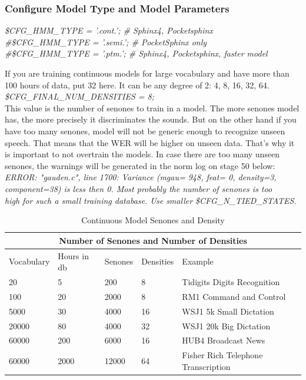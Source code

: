 \documentclass[12pt,a4paper,oneside]{memoir}
\begin{document}
\subsubsection{Configure Model Type and Model Parameters}
\textit{
\$CFG\_HMM\_TYPE = '.cont.'; \# Sphinx4, Pocketsphinx\\
\#\$CFG\_HMM\_TYPE  = '.semi.'; \# PocketSphinx only\\
\#\$CFG\_HMM\_TYPE  = '.ptm.'; \# Sphinx4, Pocketsphinx, faster model\\
}


If you are training continuous models for large vocabulary and have more than 100 hours of data, put 32 here. It can be any degree of 2: 4, 8, 16, 32, 64. 
\textit{\$CFG\_FINAL\_NUM\_DENSITIES = 8;}\\

This value is the number of senones to train in a model. The more senones model has, the more precisely it discriminates the sounds. But on the other hand if you have too many senones, model will not be generic enough to recognize unseen speech. That means that the WER will be higher on unseen data. That's why it is important to not overtrain the models. In case there are too many unseen senones, the warnings will be generated in the norm log on stage 50 below: 
\textit{
ERROR: "gauden.c", line 1700: Variance (mgau= 948, feat= 0, density=3, \\
component=38) is less then 0. Most probably the number of senones is too\\
high for such a small training database. Use smaller \$CFG\_N\_TIED\_STATES.}

\begin{table}
\centering
\caption{Continuous Model Senones and Density}
\begin{tabular}
{ |p{2cm}||p{2cm}|p{2cm}|p{2cm}|p{3cm}|  }
 \hline

 \multicolumn{5}{|c|}{Number of Senones and Number of Densities} \\
 \hline
 Vocabulary  &  Hours in db  & Senones &  Densities & Example \\
 \hline
 20 &	5    &	200  &	8  &	Tidigits Digits Recognition\\
\hline
100 &	20   &	2000 &	8  &	RM1 Command and Control\\
\hline
5000 &	30   &	4000 &	16 &	WSJ1 5k Small Dictation\\
\hline
20000 &	80   &	4000 &	32 &	WSJ1 20k Big Dictation\\
\hline
60000 &	200  &	6000 &	16 &	HUB4 Broadcast News\\
\hline
60000 &	2000 &	12000 &	64 &	Fisher Rich Telephone Transcription\\

 \hline

\end{tabular}
\end{table}
\end{document}
